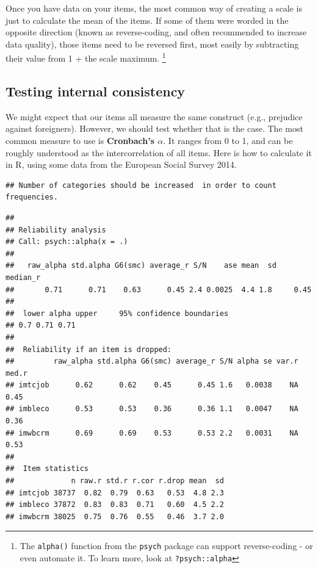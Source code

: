 \documentclass[
]{book}
\newenvironment{Shaded}{\begin{snugshade}}{\end{snugshade}}
\newcommand{\KeywordTok}[1]{\textcolor[rgb]{0.13,0.29,0.53}{\textbf{#1}}}
\newcommand{\NormalTok}[1]{#1}
\newcommand{\OperatorTok}[1]{\textcolor[rgb]{0.81,0.36,0.00}{\textbf{#1}}}
\newcommand{\StringTok}[1]{\textcolor[rgb]{0.31,0.60,0.02}{#1}}
\begin{document}
Once you have data on your items, the most common way of creating a scale is just to calculate the mean of the items. If some of them were worded in the opposite direction (known as reverse-coding, and often recommended to increase data quality), those items need to be reversed first, most easily by subtracting their value from 1 + the scale maximum. \footnote{The \texttt{alpha()} function from the \texttt{psych} package can support reverse-coding - or even automate it. To learn more, look at \texttt{?psych::alpha}}

\hypertarget{testing-internal-consistency}{%
\subsection{Testing internal consistency}\label{testing-internal-consistency}}

We might expect that our items all measure the same construct (e.g., prejudice against foreigners). However, we should test whether that is the case. The most common measure to use is \textbf{Cronbach's \(\alpha\)}. It ranges from 0 to 1, and can be roughly understood as the intercorrelation of all items. Here is how to calculate it in R, using some data from the European Social Survey 2014.

\begin{Shaded}
\end{Shaded}

\begin{verbatim}
## Number of categories should be increased  in order to count frequencies.
\end{verbatim}

\begin{verbatim}
## 
## Reliability analysis   
## Call: psych::alpha(x = .)
## 
##   raw_alpha std.alpha G6(smc) average_r S/N    ase mean  sd median_r
##       0.71      0.71    0.63      0.45 2.4 0.0025  4.4 1.8     0.45
## 
##  lower alpha upper     95% confidence boundaries
## 0.7 0.71 0.71 
## 
##  Reliability if an item is dropped:
##         raw_alpha std.alpha G6(smc) average_r S/N alpha se var.r med.r
## imtcjob      0.62      0.62    0.45      0.45 1.6   0.0038    NA  0.45
## imbleco      0.53      0.53    0.36      0.36 1.1   0.0047    NA  0.36
## imwbcrm      0.69      0.69    0.53      0.53 2.2   0.0031    NA  0.53
## 
##  Item statistics 
##             n raw.r std.r r.cor r.drop mean  sd
## imtcjob 38737  0.82  0.79  0.63   0.53  4.8 2.3
## imbleco 37872  0.83  0.83  0.71   0.60  4.5 2.2
## imwbcrm 38025  0.75  0.76  0.55   0.46  3.7 2.0
\end{verbatim}
\end{document}
